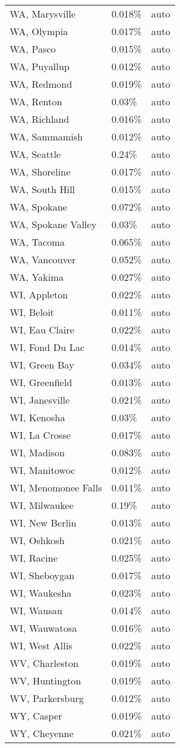 \begin{longtable}[]{@{}lll@{}}
WA, Marysville & 0.018\% & auto \\
WA, Olympia & 0.017\% & auto \\
WA, Pasco & 0.015\% & auto \\
WA, Puyallup & 0.012\% & auto \\
WA, Redmond & 0.019\% & auto \\
WA, Renton & 0.03\% & auto \\
WA, Richland & 0.016\% & auto \\
WA, Sammamish & 0.012\% & auto \\
WA, Seattle & 0.24\% & auto \\
WA, Shoreline & 0.017\% & auto \\
WA, South Hill & 0.015\% & auto \\
WA, Spokane & 0.072\% & auto \\
WA, Spokane Valley & 0.03\% & auto \\
WA, Tacoma & 0.065\% & auto \\
WA, Vancouver & 0.052\% & auto \\
WA, Yakima & 0.027\% & auto \\
WI, Appleton & 0.022\% & auto \\
WI, Beloit & 0.011\% & auto \\
WI, Eau Claire & 0.022\% & auto \\
WI, Fond Du Lac & 0.014\% & auto \\
WI, Green Bay & 0.034\% & auto \\
WI, Greenfield & 0.013\% & auto \\
WI, Janesville & 0.021\% & auto \\
WI, Kenosha & 0.03\% & auto \\
WI, La Crosse & 0.017\% & auto \\
WI, Madison & 0.083\% & auto \\
WI, Manitowoc & 0.012\% & auto \\
WI, Menomonee Falls & 0.011\% & auto \\
WI, Milwaukee & 0.19\% & auto \\
WI, New Berlin & 0.013\% & auto \\
WI, Oshkosh & 0.021\% & auto \\
WI, Racine & 0.025\% & auto \\
WI, Sheboygan & 0.017\% & auto \\
WI, Waukesha & 0.023\% & auto \\
WI, Wausau & 0.014\% & auto \\
WI, Wauwatosa & 0.016\% & auto \\
WI, West Allis & 0.022\% & auto \\
WV, Charleston & 0.019\% & auto \\
WV, Huntington & 0.019\% & auto \\
WV, Parkersburg & 0.012\% & auto \\
WY, Casper & 0.019\% & auto \\
WY, Cheyenne & 0.021\% & auto \\
\end{longtable}

